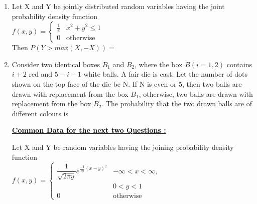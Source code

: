 \documentclass[journal,12pt,twocolumn]{IEEEtran}
\begin{document}
\begin{enumerate}
\item Let X and Y be jointly distributed random variables having the joint probability density function \\
$
f(x,y) = 
\begin{cases} 
\frac{1}{\pi} 
&  x^2+y^2 \leqslant 1 \\
0 & \text{otherwise}
\end{cases}
$ \\
Then $P(Y>max(X,-X))=$

\begin{enumerate}
\end{enumerate}
\solution


\item Consider two identical boxes $B_1$ and $B_2$, where the box $B(i=1,2)$ contains $i+2$ red and $5-i-1$ white balls. A fair die is cast. Let the number of dots shown on the top face of the die be N. If N is even or 5, then two balls are drawn with replacement from the box $B_1$, otherwise, two balls are drawn with replacement from the box $B_2$. The probability that the two drawn balls are of different colours is

\begin{enumerate}
\end{enumerate}
\solution

\begin{center}
\centering\underline{\textbf{Common Data for the next two Questions :}}
\end{center}

Let X and Y be random variables having the joining probability density function \\
$
f(x,y)=
\begin{cases}
{\dfrac{1}{\sqrt{2 \pi y}}}e^{\frac{-1}{2y}(x-y)^2}
& -\infty < x < \infty,\\  
&  0 < y < 1
\\
0 & \text{otherwise}
\end{cases}
$ \\


\end{enumerate}
\end{document}
